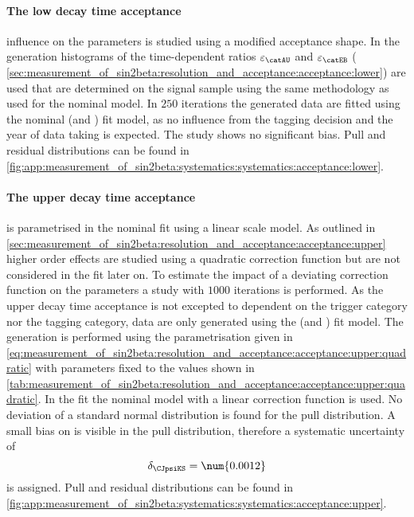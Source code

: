 \paragraph{The low decay time acceptance} influence on the \CP parameters is
studied using a modified acceptance shape. In the generation histograms of the
time-dependent ratios $\varepsilon_{\catAU}$ and $\varepsilon_{\catEB}$ (\cf
\cref{sec:measurement_of_sin2beta:resolution_and_acceptance:acceptance:lower})
are used that are determined on the signal \MC sample using the same methodology
as used for the nominal model. In $\num{250}$ iterations the generated data are
fitted using the nominal (\catOT and \catOS) fit model, as no influence from the
tagging decision and the year of data taking is expected. The \ToyMC study shows
no significant bias. Pull and residual distributions can be found
in
\cref{fig:app:measurement_of_sin2beta:systematics:systematics:acceptance:lower}.

\paragraph{The upper decay time acceptance} is parametrised in the nominal fit
using a linear scale model. As outlined in
\cref{sec:measurement_of_sin2beta:resolution_and_acceptance:acceptance:upper}
higher order effects are studied using a quadratic correction function but are
not considered in the fit later on. To estimate the impact of a deviating
correction function on the \CP parameters a \ToyMC study with $\num{1000}$
iterations is performed. As the upper decay time acceptance is not excepted to
dependent on the trigger category nor the tagging category, data are only
generated using the (\catAU and \catOS) fit model. The generation is performed
using the parametrisation given in \cref{eq:measurement_of_sin2beta:resolution_and_acceptance:acceptance:upper:quadratic} 
with parameters fixed to the values shown in
\cref{tab:measurement_of_sin2beta:resolution_and_acceptance:acceptance:upper:quadratic}. 
In the fit the nominal model with a linear correction function is used. No
deviation of a standard normal distribution is found for the \SJpsiKS pull
distribution. A small bias on \CJpsiKS is visible in the pull distribution,
therefore a systematic uncertainty of
%
\begin{equation}
  \delta_{\CJpsiKS} = \num{0.0012}
\end{equation}
%
is assigned. Pull and residual distributions can be found in
\cref{fig:app:measurement_of_sin2beta:systematics:systematics:acceptance:upper}.


